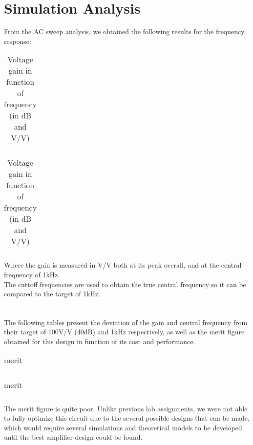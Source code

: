 \section{Simulation Analysis}
\label{sec:simulation} 

From the AC sweep analysis, we obtained the following results for the frequency response:


\begin{table}[!htb]
  \parbox{.45\linewidth}{
    \centering
    \begin{tabular}{|l|l|}
      \hline
      
    \end{tabular}
    \caption{Lower and upper cutoff frequencies plus central frequency (in Hertz)}
  }
\hfill
  \parbox{0.45\linewidth}{
    \centering
    \begin{tabular}{|l|l|}
      \hline    
      
    \end{tabular}
    \caption{Voltage gain in function of frequency (in dB and V/V)}
  }
\end{table}

Where the gain is measured in V/V both at its peak overall, and at the central frequency of 1kHz.\\
The cuttoff frequencies are used to obtain the true central frequency so it can be compared to the target of 1kHz.\\ \\ \\

The following tables present the deviation of the gain and central frequency from their target of 100V/V (40dB) and 1kHz respectively, as well as the merit figure obtained for this design in function of its cost and performance.
\begin{table}[!htb]
\parbox{.45\linewidth}{
\centering
\begin{tabular}{|l|l|}
    \hline    
    
  \end{tabular}
  \caption{deviations}
}
\hfill
\parbox{.45\linewidth}{
\centering
\begin{tabular}{|l|l|}
    \hline    
    
  \end{tabular}
  \caption{merit}
  \label{tab:Spice1}
}
\end{table}

The merit figure is quite poor. Unlike previous lab assignments, we were not able to fully optimize this circuit due to the several possible designs that can be made, which would require several simulations and theoretical models to be developed until the best amplifier design could be found.\\ \\ \\

